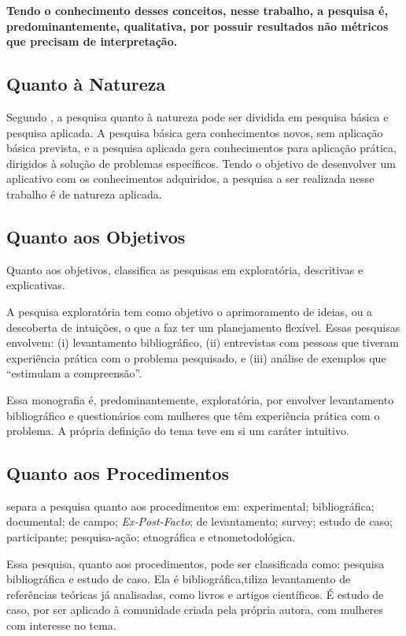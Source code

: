 \textbf{Tendo o conhecimento desses conceitos, nesse trabalho, a pesquisa é, 
predominantemente, qualitativa, por possuir resultados não métricos que precisam de 
interpretação.} 


\subsection{Quanto à Natureza}

Segundo , a pesquisa quanto à natureza pode ser dividida em pesquisa 
básica e pesquisa aplicada. A pesquisa básica gera conhecimentos novos, sem aplicação básica 
prevista, e a pesquisa aplicada gera conhecimentos para aplicação prática, dirigidos à solução de 
problemas específicos. Tendo o objetivo de desenvolver um aplicativo com os conhecimentos 
adquiridos, a pesquisa a ser realizada nesse trabalho é de natureza aplicada.

 
\subsection{Quanto aos Objetivos}

Quanto aos objetivos,  classifica as pesquisas em exploratória, 
descritivas e explicativas. 

A pesquisa exploratória tem como objetivo o aprimoramento 
de ideias, ou a descoberta de intuições, o que a faz ter um planejamento flexível. 
Essas pesquisas envolvem: (i) levantamento bibliográfico, (ii) entrevistas com pessoas 
que tiveram experiência prática com o problema pesquisado, e (iii) análise de exemplos que 
``estimulam a compreensão''.

Essa monografia é, predominantemente, exploratória, 
por envolver levantamento bibliográfico e questionários com mulheres que têm experiência 
prática com o problema. A própria definição do tema teve em si um caráter intuitivo. 

\subsection{Quanto aos Procedimentos}

 separa a pesquisa quanto aos 
procedimentos em: experimental; bibliográfica; 
documental; de campo; \emph{Ex-Post-Facto}; 
de levantamento; survey; estudo de caso; 
participante; pesquisa-ação; etnográfica e etnometodológica.

Essa pesquisa, quanto aos procedimentos, pode ser classificada como: pesquisa bibliográfica e 
estudo de caso.
Ela é bibliográfica,tiliza levantamento de referências teóricas já analisadas, 
como livros e artigos científicos. É estudo de caso, por 
ser aplicado à comunidade criada pela própria autora, com 
mulheres com interesse no tema.


